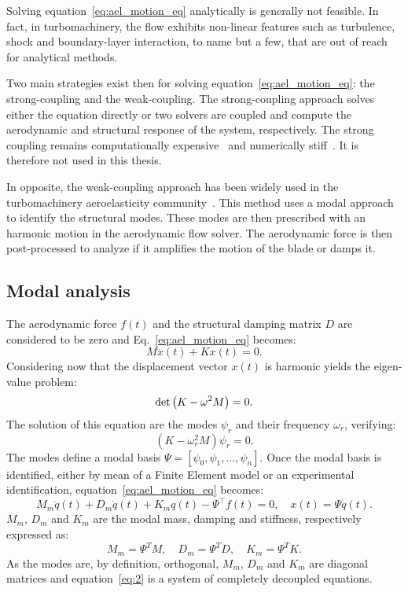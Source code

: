 
Solving equation~\ref{eq:ael_motion_eq} analytically is generally 
not feasible. In fact, in turbomachinery, 
the flow exhibits non-linear features such as turbulence, shock and
boundary-layer interaction, to name but a few, that are out of reach for
analytical methods.

Two main strategies exist then for solving equation~\ref{eq:ael_motion_eq}:
the strong-coupling and the weak-coupling. The strong-coupling 
approach solves either the equation directly or two solvers are coupled and 
compute the aerodynamic and structural response of the system, respectively.
The strong coupling remains computationally expensive~\cite{Bartels2007}
and numerically stiff~\cite{Datta2008}.
It is therefore not used in this thesis.

In opposite, the weak-coupling approach has been widely used
in the turbomachinery aeroelasticity community~\cite{Marshall1996}.
This method uses a modal approach to identify the structural modes.
These modes are then prescribed with an harmonic motion in the aerodynamic
flow solver. The aerodynamic force is then post-processed to 
analyze if it amplifies the motion of the blade or damps it.

\subsection{Modal analysis}
\label{sub:modal_analysis}

The aerodynamic force $f(t)$ and
the structural damping matrix $D$ are considered to be zero
and Eq.~\eqref{eq:ael_motion_eq} becomes:
\begin{equation}
	M \ddot{x}(t) + K x(t) = 0.
	\label{eq:ael_motion_eq_free_response}
\end{equation}
Considering now that the displacement vector $x(t)$ is harmonic
yields the eigen-value problem:
\begin{equation}
	\mdet \left(K - \omega^2 M  \right) = 0.
	\label{eq:ael_motion_eq_eigen_value}
\end{equation}
The solution of this equation are the modes $\psi_r$
and their frequency $\omega_r$, verifying:
\begin{equation}
	\left(K - \omega_r^2 M  \right) \psi_r = 0.
\end{equation}
The modes define a modal basis 
$\Psi = [\psi_0, \psi_1, \dots, \psi_n]$.
Once the modal basis
is identified, either by mean of a Finite
Element model or an experimental identification, 
equation~\ref{eq:ael_motion_eq} becomes:
\begin{equation}
  \label{eq:2}
  M_m \ddot{q}(t) + D_m \dot{q}(t) + K_m q (t) - \Psi^\top f(t)=0, \quad x(t) = \Psi q(t).
\end{equation}
$M_m$, $D_m$ and $K_m$ are the modal mass, 
damping and stiffness, respectively expressed as:
\begin{equation}
    M_m = \Psi ^ T M, \quad D_m = \Psi ^ T D, \quad K_m = \Psi ^ T K.
\end{equation}
As the modes are, by definition, orthogonal,
$M_m$, $D_m$ and $K_m$ are diagonal matrices and
equation~\eqref{eq:2} is a system of completely decoupled equations.

